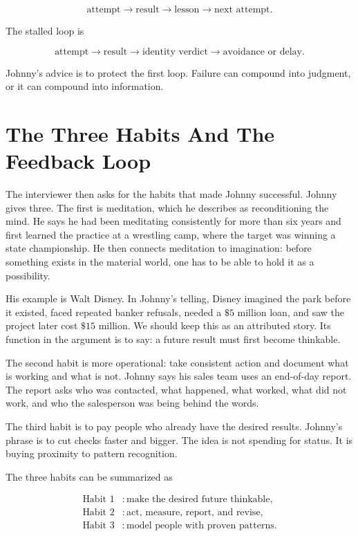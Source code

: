 \begin{equation}
\text{attempt}
\rightarrow
\text{result}
\rightarrow
\text{lesson}
\rightarrow
\text{next attempt}.
\end{equation}

The stalled loop is

\begin{equation}
\text{attempt}
\rightarrow
\text{result}
\rightarrow
\text{identity verdict}
\rightarrow
\text{avoidance or delay}.
\end{equation}

Johnny's advice is to protect the first loop. Failure can compound into judgment, or it can compound into information.

\section{The Three Habits And The Feedback Loop}

The interviewer then asks for the habits that made Johnny successful. Johnny gives three. The first is meditation, which he describes as reconditioning the mind. He says he had been meditating consistently for more than six years and first learned the practice at a wrestling camp, where the target was winning a state championship. He then connects meditation to imagination: before something exists in the material world, one has to be able to hold it as a possibility.

His example is Walt Disney. In Johnny's telling, Disney imagined the park before it existed, faced repeated banker refusals, needed a \( \$5 \) million loan, and saw the project later cost \( \$15 \) million. We should keep this as an attributed story. Its function in the argument is to say: a future result must first become thinkable.

The second habit is more operational: take consistent action and document what is working and what is not. Johnny says his sales team uses an end-of-day report. The report asks who was contacted, what happened, what worked, what did not work, and who the salesperson was being behind the words.

The third habit is to pay people who already have the desired results. Johnny's phrase is to cut checks faster and bigger. The idea is not spending for status. It is buying proximity to pattern recognition.

The three habits can be summarized as

\begin{align}
\text{Habit 1} &: \text{make the desired future thinkable},\\
\text{Habit 2} &: \text{act, measure, report, and revise},\\
\text{Habit 3} &: \text{model people with proven patterns}.
\end{align}

